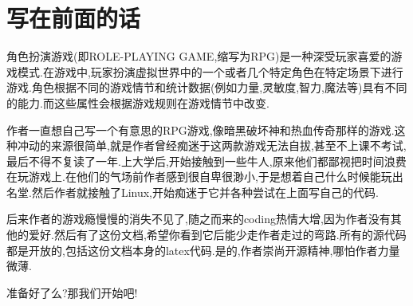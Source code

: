 \chapter{写在前面的话}
角色扮演游戏(即ROLE-PLAYING GAME,缩写为RPG)是一种深受玩家喜爱的游戏模式.在游戏中,玩家扮演虚拟世界中的一个或者几个特定角色在特定场景下进行游戏.角色根据不同的游戏情节和统计数据(例如力量,灵敏度,智力,魔法等)具有不同的能力.而这些属性会根据游戏规则在游戏情节中改变.

作者一直想自己写一个有意思的RPG游戏,像暗黑破坏神和热血传奇那样的游戏.这种冲动的来源很简单,就是作者曾经痴迷于这两款游戏无法自拔,甚至不上课不考试,最后不得不复读了一年.上大学后,开始接触到一些牛人,原来他们都鄙视把时间浪费在玩游戏上.在他们的气场前作者感到很自卑很渺小,于是想着自己什么时候能玩出名堂.然后作者就接触了Linux,开始痴迷于它并各种尝试在上面写自己的代码.

后来作者的游戏瘾慢慢的消失不见了,随之而来的coding热情大增,因为作者没有其他的爱好.然后有了这份文档,希望你看到它后能少走作者走过的弯路.所有的源代码都是开放的,包括这份文档本身的latex代码.是的,作者崇尚开源精神,哪怕作者力量微薄.

 准备好了么?那我们开始吧!
